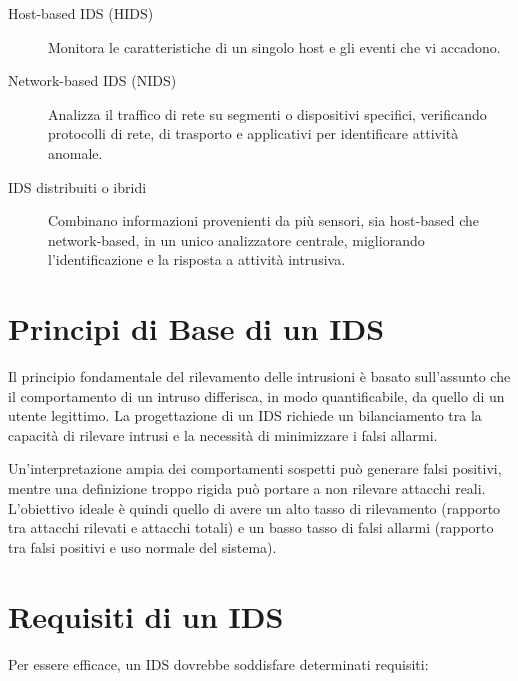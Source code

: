 \begin{description}
    \item[Host-based IDS (HIDS)] Monitora le caratteristiche di un singolo host e gli eventi che vi accadono.
    
    \item[Network-based IDS (NIDS)] Analizza il traffico di rete su segmenti o dispositivi specifici, verificando protocolli di rete, di trasporto e applicativi per identificare attività anomale.
    
    \item[IDS distribuiti o ibridi] Combinano informazioni provenienti da più sensori, sia host-based che network-based, in un unico analizzatore centrale, migliorando l'identificazione e la risposta a attività intrusiva.
\end{description}

\section{Principi di Base di un IDS}

Il principio fondamentale del rilevamento delle intrusioni è basato sull'assunto che il comportamento di un intruso differisca, in modo quantificabile, da quello di un utente legittimo. La progettazione di un IDS richiede un bilanciamento tra la capacità di rilevare intrusi e la necessità di minimizzare i falsi allarmi.

Un'interpretazione ampia dei comportamenti sospetti può generare falsi positivi, mentre una definizione troppo rigida può portare a non rilevare attacchi reali. L'obiettivo ideale è quindi quello di avere un alto tasso di rilevamento (rapporto tra attacchi rilevati e attacchi totali) e un basso tasso di falsi allarmi (rapporto tra falsi positivi e uso normale del sistema).

\section{Requisiti di un IDS}

Per essere efficace, un IDS dovrebbe soddisfare determinati requisiti:

